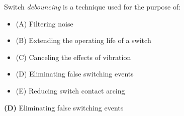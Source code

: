 

Switch {\it debouncing} is a technique used for the purpose of:

\begin{itemize}
\item{(A)} Filtering noise
\vskip 5pt 
\item{(B)} Extending the operating life of a switch
\vskip 5pt 
\item{(C)} Canceling the effects of vibration
\vskip 5pt 
\item{(D)} Eliminating false switching events
\vskip 5pt 
\item{(E)} Reducing switch contact arcing
\end{itemize}







{\bf (D)} Eliminating false switching events
 










